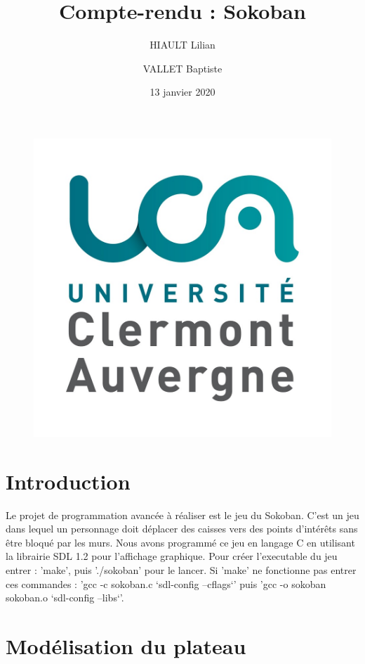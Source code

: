 \documentclass{article}
\title{Compte-rendu : Sokoban}
\author{HIAULT Lilian \and VALLET Baptiste}
\date{13 janvier 2020}
\begin{document}
\begin{figure}[t]
  \centerline{\includegraphics[scale=0.1]{logoUCA.jpg}}
\end{figure}

\maketitle

\tableofcontents

\newpage

\section*{Introduction}

Le projet de programmation avancée à réaliser est le jeu du Sokoban. C'est un jeu dans lequel un personnage doit déplacer des caisses vers des points d'intérêts sans être bloqué par les murs.
Nous avons programmé ce jeu en langage C en utilisant la librairie SDL 1.2 pour l'affichage graphique.
Pour créer l'executable du jeu entrer : 'make', puis './sokoban' pour le lancer.
Si 'make' ne fonctionne pas entrer ces commandes : 'gcc -c sokoban.c `sdl-config --cflags`' puis 'gcc -o sokoban sokoban.o `sdl-config --libs`'.

\section{Modélisation du plateau}
\end{document}
